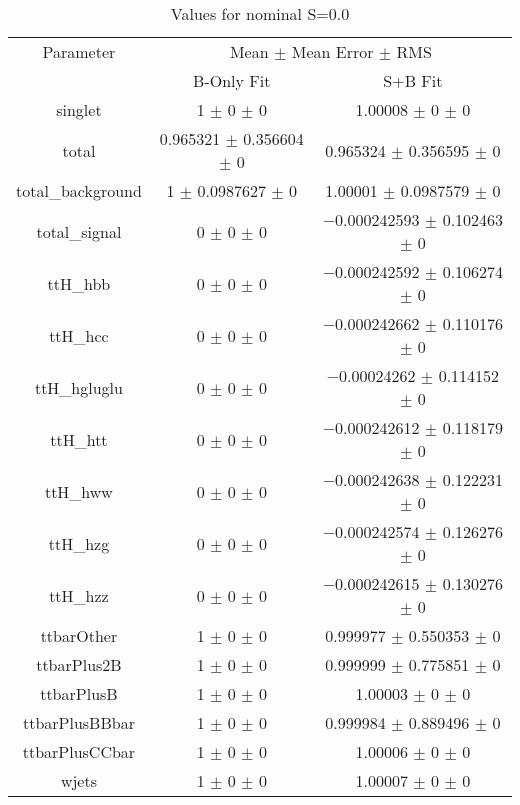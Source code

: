 \begin{table}
\centering
\caption{Values for nominal S=0.0}
\begin{tabular}{ccc}
\toprule
Parameter & \multicolumn{2}{c}{Mean $\pm$ Mean Error $\pm$ RMS}\\
 & B-Only Fit & S+B Fit\\
\midrule
singlet & \num{1} $\pm$ \num{0} $\pm$ \num{0} & \num{1.00008} $\pm$ \num{0} $\pm$ \num{0}\\
total & \num{0.965321} $\pm$ \num{0.356604} $\pm$ \num{0} & \num{0.965324} $\pm$ \num{0.356595} $\pm$ \num{0}\\
total\_background & \num{1} $\pm$ \num{0.0987627} $\pm$ \num{0} & \num{1.00001} $\pm$ \num{0.0987579} $\pm$ \num{0}\\
total\_signal & \num{0} $\pm$ \num{0} $\pm$ \num{0} & \num{-0.000242593} $\pm$ \num{0.102463} $\pm$ \num{0}\\
ttH\_hbb & \num{0} $\pm$ \num{0} $\pm$ \num{0} & \num{-0.000242592} $\pm$ \num{0.106274} $\pm$ \num{0}\\
ttH\_hcc & \num{0} $\pm$ \num{0} $\pm$ \num{0} & \num{-0.000242662} $\pm$ \num{0.110176} $\pm$ \num{0}\\
ttH\_hgluglu & \num{0} $\pm$ \num{0} $\pm$ \num{0} & \num{-0.00024262} $\pm$ \num{0.114152} $\pm$ \num{0}\\
ttH\_htt & \num{0} $\pm$ \num{0} $\pm$ \num{0} & \num{-0.000242612} $\pm$ \num{0.118179} $\pm$ \num{0}\\
ttH\_hww & \num{0} $\pm$ \num{0} $\pm$ \num{0} & \num{-0.000242638} $\pm$ \num{0.122231} $\pm$ \num{0}\\
ttH\_hzg & \num{0} $\pm$ \num{0} $\pm$ \num{0} & \num{-0.000242574} $\pm$ \num{0.126276} $\pm$ \num{0}\\
ttH\_hzz & \num{0} $\pm$ \num{0} $\pm$ \num{0} & \num{-0.000242615} $\pm$ \num{0.130276} $\pm$ \num{0}\\
ttbarOther & \num{1} $\pm$ \num{0} $\pm$ \num{0} & \num{0.999977} $\pm$ \num{0.550353} $\pm$ \num{0}\\
ttbarPlus2B & \num{1} $\pm$ \num{0} $\pm$ \num{0} & \num{0.999999} $\pm$ \num{0.775851} $\pm$ \num{0}\\
ttbarPlusB & \num{1} $\pm$ \num{0} $\pm$ \num{0} & \num{1.00003} $\pm$ \num{0} $\pm$ \num{0}\\
ttbarPlusBBbar & \num{1} $\pm$ \num{0} $\pm$ \num{0} & \num{0.999984} $\pm$ \num{0.889496} $\pm$ \num{0}\\
ttbarPlusCCbar & \num{1} $\pm$ \num{0} $\pm$ \num{0} & \num{1.00006} $\pm$ \num{0} $\pm$ \num{0}\\
wjets & \num{1} $\pm$ \num{0} $\pm$ \num{0} & \num{1.00007} $\pm$ \num{0} $\pm$ \num{0}\\
\bottomrule
\end{tabular}
\end{table}